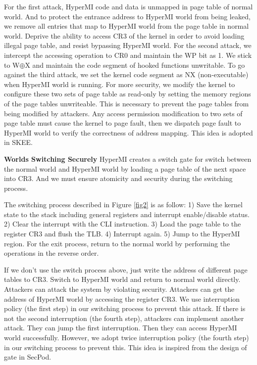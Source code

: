 \documentclass[conference]{IEEEtran}
\begin{document}
For the first attack, HyperMI code and data is unmapped in page table of normal world. And to protect the entrance address to HyperMI world from being leaked,
we remove all entries that map to HyperMI world from the page table in normal world. Deprive the ability to access CR3 of the kernel in order to avoid loading illegal page table, and resist bypassing HyperMI world.
For the second attack, we intercept the accessing operation to CR0 and maintain the WP bit as 1. We stick to W$\oplus${X} and maintain the code segment of hooked functions unwritable.
To go against the third attack, we set the kernel code segment as NX (non-executable) when HyperMI world is running. For more security, we modify the kernel to configure these two sets of page table as read-only by setting the memory regions of the page tables unwriteable. This is necessary to prevent the page tables from being modified by attackers. Any access permission modification to two sets of page table must cause the kernel to page fault, then we dispatch page fault to HyperMI world to verify the correctness of address mapping. 
This idea is adopted in SKEE\cite{Azab2016SKEE}.


\textbf{Worlds Switching Securely}
HyperMI creates a switch gate for switch between the normal world and HyperMI world by loading a page table of the next space into CR3. And we must ensure atomicity and security during the switching process.

The switching process described in Figure \ref{fig2} is as follow: 1) Save the kernel state to the stack including general registers and interrupt enable/disable status. 2) Clear the interrupt with the CLI instruction. 3) Load the page table to the register CR3 and flush the TLB. 4) Interrupt again. 5) Jump to the HyperMI region. For the exit process, return to the normal world by performing the operations in the reverse order.

If we don't use the switch process above, just write the address of different page tables to CR3. Switch to HyperMI world and return to normal world directly. Attackers can attack the system by violating security. Attackers can get the address of HyperMI world by accessing the register CR3. We use interruption policy (the first step) in our switching process to prevent this attack. 
If there is not the second interruption (the fourth step), attackers can implement another attack. They can jump the first interruption.
Then they can access HyperMI world successfully. 
However, we adopt twice interruption policy (the fourth step) in our switching process to prevent this. 
This idea is inspired from the design of gate in SecPod\cite{Wang2015SecPod}.
\end{document}
